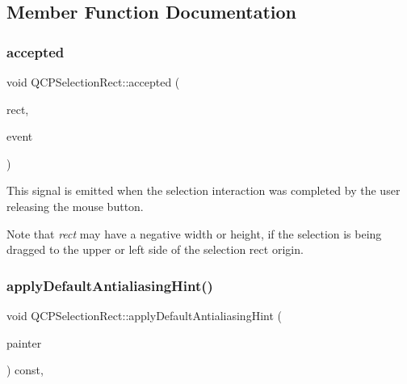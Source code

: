\subsection{Member Function Documentation}
\mbox{\label{class_q_c_p_selection_rect_a15a43542e1f7b953a44c260b419e6d2c}} 
\subsubsection{\texorpdfstring{accepted}{accepted}}
{\footnotesize\ttfamily void Q\+C\+P\+Selection\+Rect\+::accepted (\begin{DoxyParamCaption}\item[{const Q\+Rect \&}]{rect,  }\item[{Q\+Mouse\+Event $\ast$}]{event }\end{DoxyParamCaption})\hspace{0.3cm}{\ttfamily [signal]}}

This signal is emitted when the selection interaction was completed by the user releasing the mouse button.

Note that {\itshape rect} may have a negative width or height, if the selection is being dragged to the upper or left side of the selection rect origin. \mbox{\label{class_q_c_p_selection_rect_aa854697618e16037ba9c73056abfb9bf}} 
\subsubsection{\texorpdfstring{apply\+Default\+Antialiasing\+Hint()}{applyDefaultAntialiasingHint()}}
{\footnotesize\ttfamily void Q\+C\+P\+Selection\+Rect\+::apply\+Default\+Antialiasing\+Hint (\begin{DoxyParamCaption}\item[{\hyperlink{class_q_c_p_painter}{Q\+C\+P\+Painter} $\ast$}]{painter }\end{DoxyParamCaption}) const\hspace{0.3cm}{\ttfamily [protected]}, {\ttfamily [virtual]}}



